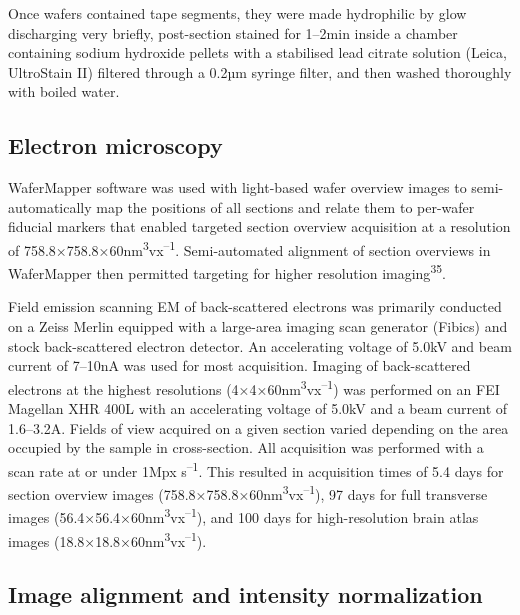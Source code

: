 \documentclass{article}
\begin{document}
Once wafers contained tape segments, they were made hydrophilic by glow discharging very briefly, post-section stained for 1–2min inside a chamber containing sodium hydroxide pellets with a stabilised lead citrate solution (Leica, UltroStain II) filtered through a 0.2µm syringe filter, and then washed thoroughly with boiled water.

\subsection*{Electron microscopy}

WaferMapper software was used with light-based wafer overview images to semi-automatically map the positions of all sections and relate them to per-wafer fiducial markers that enabled targeted section overview acquisition at a resolution of 758.8×758.8×60nm\textsuperscript{3}vx\textsuperscript{–1}. Semi-automated alignment of section overviews in WaferMapper then permitted targeting for higher resolution imaging\textsuperscript{35}.

Field emission scanning EM of back-scattered electrons was primarily conducted on a Zeiss Merlin equipped with a large-area imaging scan generator (Fibics) and stock back-scattered electron detector. An accelerating voltage of 5.0kV and beam current of 7–10nA was used for most acquisition. Imaging of back-scattered electrons at the highest resolutions (4×4×60nm\textsuperscript{3}vx\textsuperscript{–1}) was performed on an FEI Magellan XHR 400L with an accelerating voltage of 5.0kV and a beam current of 1.6–3.2A. Fields of view acquired on a given section varied depending on the area occupied by the sample in cross-section. All acquisition was performed with a scan rate at or under 1Mpx s\textsuperscript{–1}. This resulted in acquisition times of 5.4 days for section overview images (758.8×758.8×60nm\textsuperscript{3}vx\textsuperscript{–1}), 97 days for full transverse images (56.4×56.4×60nm\textsuperscript{3}vx\textsuperscript{–1}), and 100 days for high-resolution brain atlas images (18.8×18.8×60nm\textsuperscript{3}vx\textsuperscript{–1}).

\subsection*{Image alignment and intensity normalization}
\end{document}
